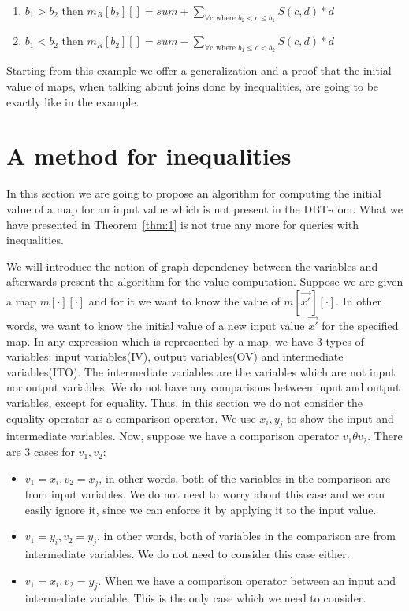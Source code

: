 \documentclass[12pt]{article}
\newcommand{\dom}{\textsf{DBT-dom}}
\begin{document}
\begin{enumerate}
\item $b_{1}>b_{2}$ then $m_R[b_{2}][]=sum + \sum_{\forall\mbox{c where }b_{2}<c\leq b_{1}} S(c,d)*d$
\item $b_{1}<b_{2}$ then $m_R[b_{2}][]=sum - \sum_{\forall\mbox{c where }b_{1}\leq c<b_{2}} S(c,d)*d$
\end{enumerate}

Starting from this example we offer a generalization and a proof that the initial value of maps, when talking about joins done by inequalities, are going to be exactly like in the example.
\section{A method for inequalities}
In this section we are going to propose an algorithm for computing the initial value of a map for an input value which is not present in the \dom{}. What we have presented in Theorem~\ref{thm:1} is not true any more for queries with inequalities. %

We will introduce the notion of graph dependency between the variables and afterwards present the algorithm for the value computation. Suppose we are given a map $m[\cdot][\cdot]$ and for it we want to know the value of $m[\vec{x'}][\cdot]$. In other words, we want to know the initial value of a new input value $\vec{x'}$ for the specified map. In any expression which is represented by a map, we have 3 types of variables: input variables(IV), output variables(OV) and intermediate variables(ITO). The intermediate variables are the variables which are not input nor output variables. 
We do not have any comparisons between input and output variables, except for equality. Thus, in this section we do not consider the equality operator as a comparison operator. 
We use $x_{i}, y_{j}$ to show the input and intermediate variables. Now, suppose we have a comparison operator $v_{1}\theta v_{2}$. There are 3 cases for $v_{1},v_{2}$: 
\begin{itemize}
\item $v_{1}=x_{i}, v_{2}=x_{j}$, in other words, both of the variables in the comparison are from input variables. We do not need to worry about this case and we can easily ignore it, since we can enforce it by applying it to the input value.
\item $v_{1}=y_{i}, v_{2}=y_{j}$, in other words, both of variables in the comparison are from intermediate variables. We do not need to consider this case either. 
\item $v_{1}=x_{i}, v_{2}=y_{j}$. When we have a comparison operator between an input and intermediate variable. This is the only case which we need to consider. 
\end{itemize}
\end{document}
